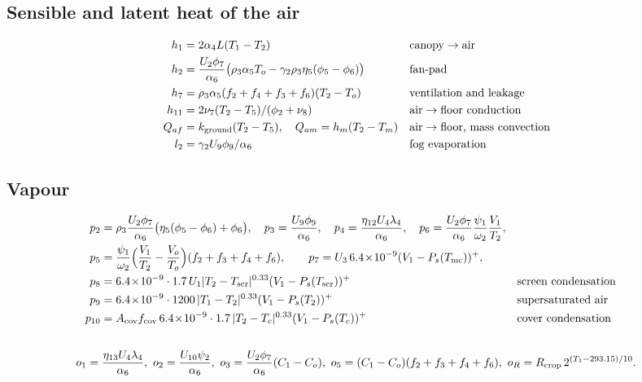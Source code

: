 \documentclass[11pt,a4paper]{article}
\begin{document}
\subsection{Sensible and latent heat of the air}
\begin{align}
h_1&=2\alpha_4L(T_1-T_2) &&\text{canopy}\to\text{air}\\
h_2&=\frac{U_2\phi_7}{\alpha_6}\bigl(\rho_3\alpha_5T_o-\gamma_2\rho_3\eta_5(\phi_5-\phi_6)\bigr) &&\text{fan-pad}\\
h_7&=\rho_3\alpha_5(f_2+f_4+f_3+f_6)(T_2-T_o) &&\text{ventilation and leakage}\\
h_{11}&=2\nu_7(T_2-T_5)/(\phi_2+\nu_8) &&\text{air}\to\text{floor conduction}\\
Q_{af}&=k_{\rm ground}(T_2-T_5),\quad Q_{am}=h_m(T_2-T_m) &&\text{air}\to\text{floor, mass convection}\\
l_2&=\gamma_2U_9\phi_9/\alpha_6 &&\text{fog evaporation}
\end{align}

\subsection{Vapour}
\begin{align}
p_2&=\rho_3\frac{U_2\phi_7}{\alpha_6}\bigl(\eta_5(\phi_5-\phi_6)+\phi_6\bigr),\quad p_3=\frac{U_9\phi_9}{\alpha_6},\quad
p_4=\frac{\eta_{12}U_4\lambda_4}{\alpha_6},\quad p_6=\frac{U_2\phi_7}{\alpha_6}\frac{\psi_1}{\omega_2}\frac{V_1}{T_2},\\
p_5&=\frac{\psi_1}{\omega_2}\Bigl(\frac{V_1}{T_2}-\frac{V_o}{T_o}\Bigr)(f_2+f_3+f_4+f_6),\qquad
p_7=U_3\,6.4\!\times\!10^{-9}(V_1-P_s(T_{\rm mc}))^+,\\
p_8&=6.4\!\times\!10^{-9}\cdot1.7\,U_1|T_2-T_{\rm scr}|^{0.33}(V_1-P_s(T_{\rm scr}))^+ &&\text{screen condensation}\\
p_9&=6.4\!\times\!10^{-9}\cdot1200\,|T_1-T_2|^{0.33}(V_1-P_s(T_2))^+ &&\text{supersaturated air}\\
p_{10}&=A_{\rm cov}f_{\rm cov}\,6.4\!\times\!10^{-9}\cdot1.7\,|T_2-T_c|^{0.33}(V_1-P_s(T_c))^+ &&\text{cover condensation}
\end{align}

\subsection{}
\begin{equation}
o_1=\frac{\eta_{13}U_4\lambda_4}{\alpha_6},\ o_2=\frac{U_{10}\psi_2}{\alpha_6},\ o_3=\frac{U_2\phi_7}{\alpha_6}(C_1-C_o),\
o_5=(C_1-C_o)(f_2+f_3+f_4+f_6),\ o_R=R_{\rm crop}\,2^{(T_1-293.15)/10}.
\end{equation}
\end{document}

